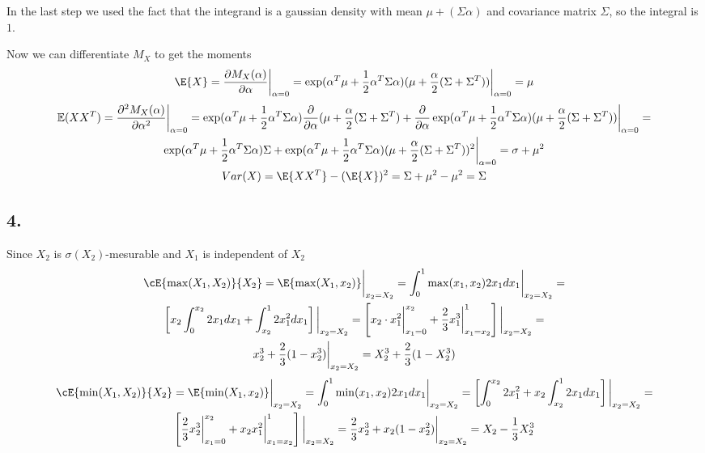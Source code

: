 In the last step we used the fact that the integrand is a gaussian density with mean $\mu+(\Sigma\alpha)$ and covariance matrix $\Sigma$, so the integral is $1$.

Now we can differentiate $M_X$ to get the moments
\begin{gather*}
    \E{X}=\frac{\partial M_X(\alpha)}{\partial \alpha}\bigg \lvert_{\alpha=0} = \exp( \alpha^T\mu +\frac{1}{2}\alpha^T\Sigma\alpha)(\mu+\frac{\alpha}{2}(\Sigma+\Sigma^T))\bigg\lvert_{\alpha=0}=\mu
\end{gather*}
\begin{gather*}
    \mathbb{E}(XX^T)=\frac{\partial^2M_X(\alpha)}{\partial\alpha^2}\bigg\lvert_{\alpha=0} = \exp( \alpha^T\mu +\frac{1}{2}\alpha^T\Sigma\alpha) \frac{\partial}{\partial \alpha}(\mu+\frac{\alpha}{2}(\Sigma+\Sigma^T) + \frac{\partial}{\partial\alpha}\exp( \alpha^T\mu +\frac{1}{2}\alpha^T\Sigma\alpha) (\mu+\frac{\alpha}{2}(\Sigma+\Sigma^T))\bigg \lvert_{\alpha=0}  =\\
    \exp( \alpha^T\mu +\frac{1}{2}\alpha^T\Sigma\alpha) \Sigma + \exp( \alpha^T\mu +\frac{1}{2}\alpha^T\Sigma\alpha)(\mu+\frac{\alpha}{2}(\Sigma+\Sigma^T))^2\bigg \lvert_{\alpha=0} = \sigma + \mu^2 \\
    Var(X) = \E{XX^T}-(\E{X})^2= \Sigma+\mu^2-\mu^2=\Sigma
\end{gather*}

\subsection*{4.} Since $X_2$ is $\sigma(X_2)$-mesurable and $X_1$ is independent of $X_2$
\begin{gather*}
    \cE{\max(X_1,X_2)}{X_2} = \E{\max(X_1,x_2)}\bigg\lvert_{x_2=X_2} = \int_{0}^{1} \max(x_1, x_2)2x_1 dx_1 \bigg\lvert_{x_2=X_2}= \\
    \left[x_2 \int_0^{x_2} 2x_1 dx_1 + \int_{x_2}^1 2x_1^2 dx_1 \right]\bigg\lvert_{x_2=X_2} = \left[ x_2 \cdot x_1^2 \bigg   \lvert_{x_1=0}^{x_2} + \frac{2}{3}x_1^3  \bigg \lvert_{x_1=x_2}^1  \right]  \bigg\lvert_{x_2=X_2} = \\ x_2^3+\frac{2}{3}(1-x_2^3)\bigg\lvert_{x_2=X_2} = X_2^3 + \frac{2}{3}(1-X_2^3)
\end{gather*}
\begin{gather*}
    \cE{\min(X_1,X_2)}{X_2} = \E{\min(X_1,x_2)}\bigg\lvert_{x_2=X_2} = \int_0^1 \min(x_1, x_2) 2x_1 dx_1 \bigg\lvert_{x_2=X_2} = 
    \left [\int_0^{x_2} 2x_1^2 + x_2\int_{x_2}^1 2x_1 dx_1 \right] \bigg\lvert_{x_2=X_2}  = \\
    \left[ \frac{2}{3}x_2^3\bigg\lvert_{x_1=0}^{x_2}+x_2x_1^2 \bigg\lvert_{x_1=x_2}^{1}\right]\bigg\lvert_{x_2=X_2} = \frac{2}{3}x_2^3+x_2(1-x_2^2)\bigg\lvert_{x_2=X_2} = X_2-\frac{1}{3}X_2^3
\end{gather*}
